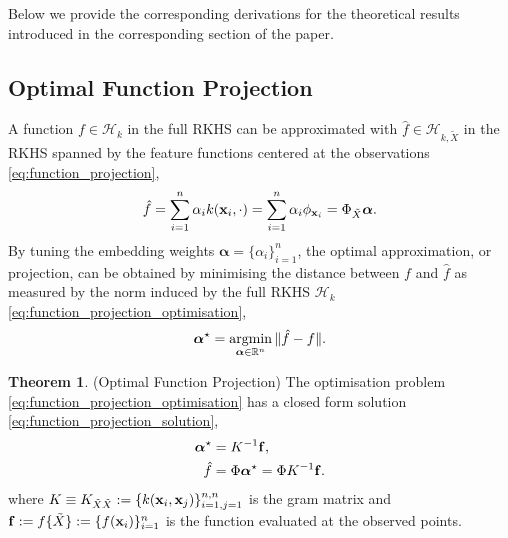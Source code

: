 \documentclass[twoside]{article} \usepackage{aistats2017}
\theoremstyle{definition}
\theoremstyle{theorem}
\newtheorem{theorem}{Theorem}[section]
\newcommand{\argmin}{\operatornamewithlimits{argmin}}
\newcommand{\ds}[1]{\tilde{#1}}
\begin{document}
	Below we provide the corresponding derivations for the theoretical results introduced in the corresponding section of the paper.

	\subsection{Optimal Function Projection}
	\label{sec:direct_quantile_regression:optimal_function_projection}

		A function $f \in \mathcal{H}_{k}$ in the full RKHS can be approximated with $\hat{f} \in \mathcal{H}_{k, \ds{X}}$ in the RKHS spanned by the feature functions centered at the observations \eqref{eq:function_projection},
		\begin{equation}
			\hat{f} = \sum_{i = 1}^{n} \alpha_{i} k(\bvec{x}_{i}, \cdot) = \sum_{i = 1}^{n} \alpha_{i} \phi_{\bvec{x}_{i}} = \Phi_{\ds{X}} \bm{\alpha}.
		\label{eq:function_projection}
		\end{equation}
		By tuning the embedding weights $\bm{\alpha} = \{\alpha_{i}\}_{i = 1}^{n}$, the optimal approximation, or projection, can be obtained by minimising the distance between $f$ and $\hat{f}$ as measured by the norm induced by the full RKHS $\mathcal{H}_{k}$ \eqref{eq:function_projection_optimisation},
		\begin{equation}
			\bm{\alpha}^{\star} = \argmin_{\bm{\alpha} \in \mathbb{R}^{n}} \Vert \hat{f} - f \Vert.
		\label{eq:function_projection_optimisation}
		\end{equation}

		\begin{theorem} \label{thm:function_projection_solution}
			(Optimal Function Projection)
			The optimisation problem \eqref{eq:function_projection_optimisation} has a closed form solution \eqref{eq:function_projection_solution},
			\begin{equation}
				\begin{aligned}
					\bm{\alpha}^{\star} &= K^{-1} \mathbf{f}, \\
					\hat{f} &= \Phi \bm{\alpha}^{\star} = \Phi K^{-1} \mathbf{f}.
				\end{aligned}
			\label{eq:function_projection_solution}
			\end{equation}
			where $K \equiv K_{\ds{X} \ds{X}} := \{k(\bvec{x}_{i}, \bvec{x}_{j})\}_{i = 1, j = 1}^{n, n}$ is the gram matrix and $\bvec{f} := f\{\ds{X}\} := \{f(\bvec{x}_{i})\}_{i = 1}^{n}$ is the function evaluated at the observed points.
		\end{theorem}
			
\end{document}
